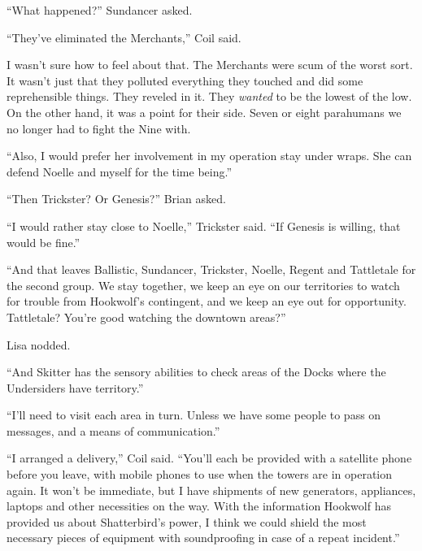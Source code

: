 ``What happened?''  Sundancer asked.



``They've eliminated the Merchants,'' Coil said.



I wasn't sure how to feel about that.  The Merchants were scum of the worst sort.  It wasn't just that they polluted everything they touched and did some reprehensible things.  They reveled in it.  They \emph{wanted }to be the lowest of the low.  On the other hand, it was a point for their side.  Seven or eight parahumans we no longer had to fight the Nine with.



``Also, I would prefer her involvement in my operation stay under wraps.  She can defend Noelle and myself for the time being.''



``Then Trickster?  Or Genesis?''  Brian asked.



``I would rather stay close to Noelle,'' Trickster said.  ``If Genesis is willing, that would be fine.''



``And that leaves Ballistic, Sundancer, Trickster, Noelle, Regent and Tattletale for the second group.  We stay together, we keep an eye on our territories to watch for trouble from Hookwolf's contingent, and we keep an eye out for opportunity.  Tattletale?  You're good watching the downtown areas?''



Lisa nodded.



``And Skitter has the sensory abilities to check areas of the Docks where the Undersiders have territory.''



``I'll need to visit each area in turn.  Unless we have some people to pass on messages, and a means of communication.''



``I arranged a delivery,'' Coil said.  ``You'll each be provided with a satellite phone before you leave, with mobile phones to use when the towers are in operation again.  It won't be immediate, but I have shipments of new generators, appliances, laptops and other necessities on the way.  With the information Hookwolf has provided us about Shatterbird's power, I think we could shield the most necessary pieces of equipment with soundproofing in case of a repeat incident.''



